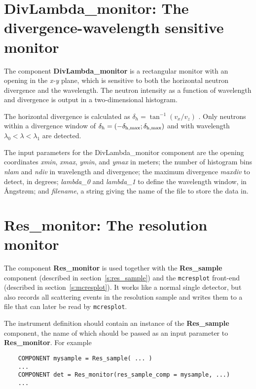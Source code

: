 \section{DivLambda\_monitor: The divergence-wavelength sensitive monitor}

The component {\bf DivLambda\_monitor} is a rectangular monitor
with an opening in the \textit{x-y} plane,
which is sensitive to both the horizontal neutron divergence and the
wavelength. The neutron intensity as a function of wavelength and
divergence is output in a two-dimensional histogram.

The horizontal divergence is calculated as $\delta_h = \tan^{-1}(v_x/v_z)$ .
Only neutrons within a divergence window of
$\delta_h = (-\delta_{\rm h,max} ; \delta_{\rm h,max})$ and with
wavelength $\lambda_0 < \lambda < \lambda_1$ are detected.

The input parameters for the DivLambda\_monitor component are the opening coordinates
\textit{xmin}, \textit{xmax}, \textit{ymin}, and
\textit{ymax} in meters;
the number of histogram bins \textit{nlam} and \textit{ndiv} in
wavelength and divergence; the maximum divergence \textit{maxdiv} to
detect, in degrees; \textit{lambda\_0} and \textit{lambda\_1} to define
the wavelength window, in {\AA}ngstr{\o}m; and \textit{filename}, a
string giving the name of the file to store the data in.





\section{Res\_monitor: The resolution monitor}
\label{s:res_monitor}
The component \textbf{Res\_monitor} is used together with the
\textbf{Res\_sample} component (described in section~\ref{s:res_sample})
and the \verb+mcresplot+ front-end (described in
section~\ref{s:mcresplot}). It works like a normal single detector, but
also records all scattering events in the resolution sample and writes
them to a file that can later be read by \verb+mcresplot+.

The instrument definition should contain an instance of the
\textbf{Res\_sample} component, the name of which should be passed as an
input parameter to \textbf{Res\_monitor}. For example
\begin{verbatim}
    COMPONENT mysample = Res_sample( ... )
    ...
    COMPONENT det = Res_monitor(res_sample_comp = mysample, ...)
    ...
\end{verbatim}

